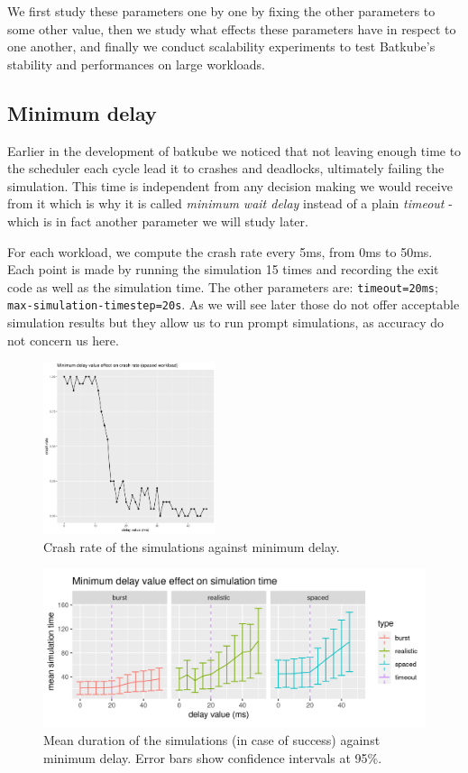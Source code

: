 We first study these parameters one by one by fixing the other parameters to
some other value, then we study what effects these parameters have in respect
to one another, and finally we conduct scalability experiments to test
Batkube's stability and performances on large workloads.

\subsection{Minimum delay}

Earlier in the development of batkube we noticed that not leaving enough time
to the scheduler each cycle lead it to crashes and deadlocks, ultimately
failing the simulation. This time is independent from any decision making we
would receive from it which is why it is called \textit{minimum wait delay}
instead of a plain \textit{timeout} - which is in fact another parameter we
will study later.

For each workload, we compute the crash rate every 5ms, from 0ms to 50ms. Each
point is made by running the simulation 15 times and recording the exit code as
well as the simulation time. The other parameters are: \texttt{timeout=20ms};
\texttt{max-simulation-timestep=20s}. As we will see later those do not offer
acceptable simulation results but they allow us to run prompt simulations, as
accuracy do not concern us here.\\

\begin{figure}
	\centering
	\includegraphics[width=0.45\textwidth]{imgs/min-delay_spaced_200_delay170_crash_old.png}
	\caption{Crash rate of the simulations against minimum delay.}
	\label{fig:min-delay_crash}
\end{figure}

\begin{figure}
	\centering
	\includegraphics[width=\textwidth]{imgs/min-delay_duration.png}
	\caption{Mean duration of the simulations (in case of success) against minimum delay. Error bars show confidence intervals at 95\%.}
	\label{fig:min-delay_duration}
\end{figure}

